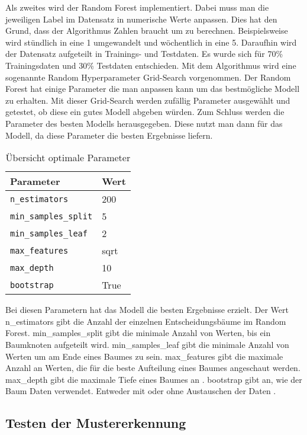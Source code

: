 Als zweites wird der Random Forest implementiert. Dabei muss man die jeweiligen Label im Datensatz in numerische Werte anpassen. Dies hat den Grund, dass der Algorithmus Zahlen braucht um zu berechnen. Beispielsweise wird stündlich in eine 1 umgewandelt und wöchentlich in eine 5. Daraufhin wird der Datensatz aufgeteilt in Trainings- und Testdaten. Es wurde sich für 70\% Trainingsdaten und 30\% Testdaten entschieden. Mit dem Algorithmus wird eine sogenannte Random Hyperparameter Grid-Search vorgenommen. Der Random Forest hat einige Parameter die man anpassen kann um das bestmögliche Modell zu erhalten. Mit dieser Grid-Search werden zufällig Parameter ausgewählt und getestet, ob diese ein gutes Modell abgeben würden. Zum Schluss werden die Parameter des besten Modells herausgegeben. Diese nutzt man dann für das Modell, da diese Parameter die besten Ergebnisse liefern.

\begin{table}[H]
	\centering
	\begin{tabular}{lp{10cm}}
		\textbf{Parameter} & \textbf{Wert}\\\toprule
		\texttt{n\_estimators} & 200 \\\midrule
		\texttt{min\_samples\_split} & 5 \\\midrule
		\texttt{min\_samples\_leaf} & 2\\\midrule
		\texttt{max\_features} & sqrt\\\midrule
		\texttt{max\_depth} & 10\\\midrule
		\texttt{bootstrap} & True
		\\\bottomrule
	\end{tabular}
	\caption{\label{tab:dateien}Übersicht optimale Parameter}
\end{table}

Bei diesen Parametern hat das Modell die besten Ergebnisse erzielt. Der Wert n\_estimators gibt die Anzahl der einzelnen Entscheidungsbäume im Random Forest. min\_samples\_split gibt die minimale Anzahl von Werten, bis ein Baumknoten aufgeteilt wird. min\_samples\_leaf gibt die minimale Anzahl von Werten um am Ende eines Baumes zu sein. max\_features gibt die maximale Anzahl an Werten, die für die beste Aufteilung eines Baumes angeschaut werden. max\_depth gibt die maximale Tiefe eines Baumes an \autocite[Vgl.][]{.11112021}. bootstrap gibt an, wie der Baum Daten verwendet. Entweder mit oder ohne Austauschen der Daten \autocite[Vgl.][]{.11112021b}.

\subsection{Testen der Mustererkennung}

